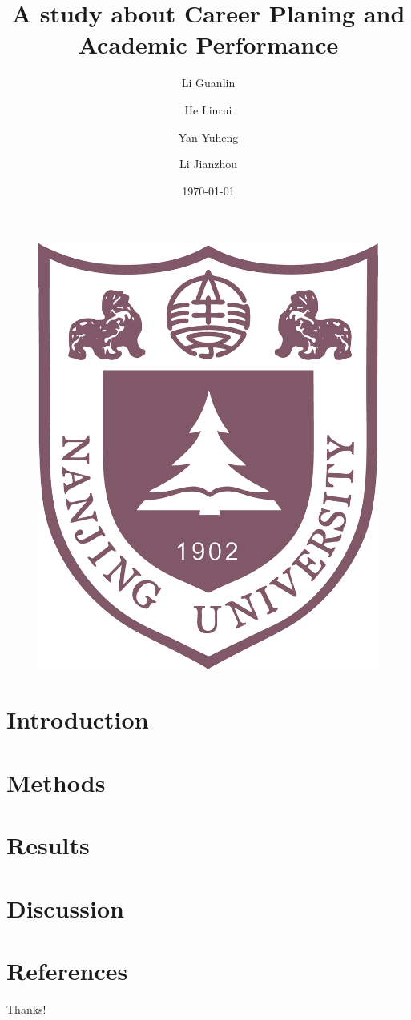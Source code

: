 \documentclass{beamer}
\title[Listening and Speaking Class]
{A study about Career Planing and Academic Performance}
\author[Eric] %
{Li Guanlin\inst{1} \and He Linrui\inst{1} \and Yan Yuheng\inst{1} \and Li Jianzhou\inst{1}}
\institute[NJU] %
{
\inst{1}%
Undergraduates of ICS\\
Nanjing University
\and
}
\date[NJU 2023] %
{\today}
\begin{document}
\begin{frame}
    \titlepage
    \begin{figure}[htpb]
        \begin{center}
            \includegraphics[width=0.2\linewidth]{pic/NJU_Logo.eps}
        \end{center}
    \end{figure}
\end{frame}

\begin{frame}
    \tableofcontents[sectionstyle=show,subsectionstyle=show/shaded/hide,subsubsectionstyle=show/shaded/hide]
\end{frame}

\section{Introduction}


\section{Methods}


\section{Results}


\section{Discussion}


\section{References}

\begin{frame}[allowframebreaks]
    
    
\end{frame}

\begin{frame}
    \begin{center}
        {\Huge\calligra Thanks!}\cite{origin}
    \end{center}
\end{frame}
\end{document}
